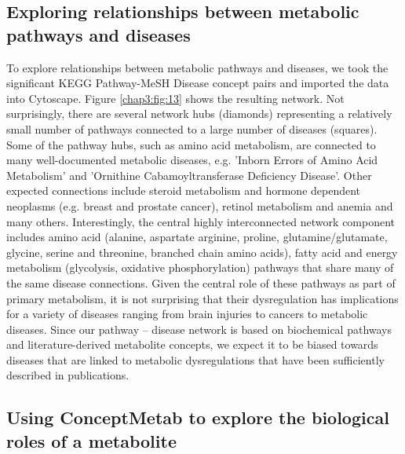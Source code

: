 \subsection{Exploring relationships between metabolic pathways and diseases}
\label{conceptmetab_results_pathways}

To explore relationships between metabolic pathways and diseases, we took the significant KEGG Pathway-MeSH Disease concept pairs and imported the data into Cytoscape. Figure \ref{chap3:fig:13} shows the resulting network. Not surprisingly, there are several network hubs (diamonds) representing a relatively small number of pathways connected to a large number of diseases (squares). Some of the pathway hubs, such as amino acid metabolism, are connected to many well-documented metabolic diseases, e.g. 'Inborn Errors of Amino Acid Metabolism' and 'Ornithine Cabamoyltransferase Deficiency Disease'. Other expected connections include steroid metabolism and hormone dependent neoplasms (e.g. breast and prostate cancer), retinol metabolism and anemia and many others. Interestingly, the central highly interconnected network component includes amino acid (alanine, aspartate arginine, proline, glutamine/glutamate, glycine, serine and threonine, branched chain amino acids), fatty acid and energy metabolism (glycolysis, oxidative phosphorylation) pathways that share many of the same disease connections. Given the central role of these pathways as part of primary metabolism, it is not surprising that their dysregulation has implications for a variety of diseases ranging from brain injuries to cancers to metabolic diseases. Since our pathway – disease network is based on biochemical pathways and literature-derived metabolite concepts, we expect it to be biased towards diseases that are linked to metabolic dysregulations that have been sufficiently described in publications.

\subsection{Using ConceptMetab to explore the biological roles of a metabolite}
\label{conceptmetab_results_metabolite}

